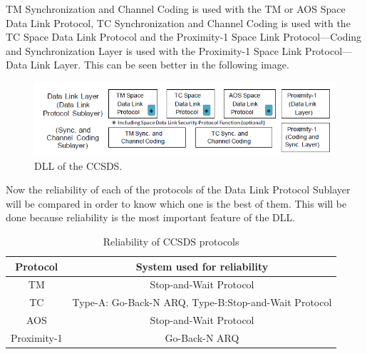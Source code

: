 TM Synchronization and Channel Coding is used with the TM or AOS Space Data Link
Protocol, TC Synchronization and Channel Coding is used with the TC Space Data Link Protocol and the Proximity-1 Space Link Protocol—Coding and Synchronization Layer is
used with the Proximity-1 Space Link Protocol—Data Link Layer. This can be seen better in the following image.

\begin{figure}[H]
\begin{center}
\includegraphics[scale=0.9]{DLLCCSDS.PNG}   
\caption{DLL of the CCSDS.}
\end{center}
\end{figure}

Now the reliability of each of the protocols of the Data Link Protocol Sublayer will be compared in order to know which one is the best of them. This will be done because reliability is the most important feature of the DLL.

\begin{table}[H]
\begin{center}
\begin{tabular}{|c|c|}
\hline
\textbf{Protocol}&\textbf{System used for reliability}\\
\hline
TM&Stop-and-Wait Protocol\\
\hline
TC&Type-A: Go-Back-N ARQ, Type-B:Stop-and-Wait Protocol\\
\hline
AOS&Stop-and-Wait Protocol\\
\hline
Proximity-1&Go-Back-N ARQ\\
\hline
\end{tabular}
\caption{Reliability of CCSDS protocols}
\end{center}
\end{table}

